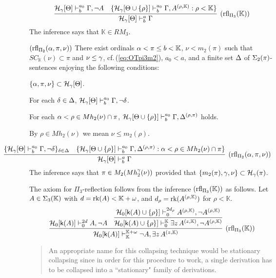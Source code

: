 \documentclass{article}
\newcommand{\mK}{\mathbb{K}}
\begin{document}
\[
\infer[({\rm rfl}_{\Pi_{3}}(\mK))]{
\calh_{\gam}[\Tht]\vdash^{a}_{b}\Gam}
{
\mathcal{H}_{\gam}[\Tht]\vdash^{a_{0}}_{b}\Gamma, \lnot A
&
\{
\mathcal{H}_{\gam}[\Tht\cup \{\rho\}]\vdash^{a_{0}}_{b}\Gamma, 
A^{(\rho,\mK)}: \rho<\mK\}
}
\]
The inference says that $\mK\in RM_{3}$.

\item[$({\rm rfl}_{\Pi_{2}}(\alpha,\pi,\nu))$]
There exist ordinals 
$\alp<\pi\leq b<\mK$, 
$\nu< 
m_{2}(\pi)$ such that $SC_{\mK}(\nu)\subset\pi$ and 
$\nu\leq\gamma$, cf.\,(\ref{eq:OTpi3m2}), 
$a_{0}<a$,
and a finite set $\Delta$ of $\Sigma_{2}(\pi)$-sentences enjoying the following conditions:


\benu

\item
$\{\alpha,\pi,
\nu\}\subset{\cal H}_{\gamma}[\Theta]$.



 \item
For each $\delta\in\Delta$,
$
\mathcal{H}_{\gamma}[\Theta]\vdash^{a_{0}}_{b}\Gamma, \lnot\delta
$.

\item
For each
$\alpha<\rho\in Mh_{2}(\nu)\cap\pi$,
$\mathcal{H}_{\gamma}[\Theta\cup\{\rho\}]\vdash^{a_{0}}_{b}\Gamma, 
\Delta^{(\rho,\pi)}$ holds.

By $\rho\in Mh_{2}(\nu)$ we mean
$\nu\leq m_{2}(\rho)$.

\eenu
{\small
\[
\hspace{-15mm}
\infer[({\rm rfl}_{\Pi_{2}}(\alp,\pi,\nu))]{
\calh_{\gam}[\Tht]\vdash^{a}_{b}\Gam}
{
\{
\mathcal{H}_{\gam}[\Tht]\vdash^{a_{0}}_{b}\Gamma, \lnot\del
\}_{\del\in\Del}
&
\{
\mathcal{H}_{\gam}[\Tht\cup\{\rho\}]\vdash^{a_{0}}_{b}\Gamma, 
\Del^{(\rho,\pi)}: \alp<\rho\in Mh_{2}(\nu)\cap \pi
\}
}
\]
}
The inference says that 
$\pi\in M_{2}(Mh_{2}^{\gamma}(\nu))$
provided that $\{m_{2}(\pi),\gamma, \nu\}\subset{\cal H}_{\gamma}(\pi)$.
\edes



The axiom for $\Pi_{3}$-reflection follows from the inference $({\rm rfl}_{\Pi_{3}}(\mK))$ as follows.
Let $A\in\Sig_{3}(\mK)$ with $d=\rk(A)<\mK+\ome$, and 
$d_{\rho}=\rk(A^{(\rho,\mK)})$ for
$\rho<\mK$.
\[
\infer[({\rm rfl}_{\Pi_{3}}(\mK))]{\calh_{0}[\sfk(A)]\vdash^{\mK+\ome}_{\mK}\lnot A,\exi z\, A^{(z,\mK)}}
{
 \calh_{0}[\sfk(A)]\vdash^{2d}_{0} A,\lnot A
 &
 \infer{\calh_{0}[\sfk(A)\cup\{\rho\}]\vdash^{\mK}_{0}\exi z\, A^{(z,\mK)},\lnot A^{(\rho,\mK)}}
 {
 \calh_{0}[\sfk(A)\cup\{\rho\}]\vdash^{2d_{\rho}}_{0} A^{(\rho,\mK)},\lnot A^{(\rho,\mK)}
 }
}
\]

\begin{quote}
An appropriate name for this collapsing technique would be stationary collapsing since in order for
this procedure to work, a single derivation has to be collapsed into a ``stationary" family of derivations.
\cite{Rathjen94}
\end{quote}
\end{document}
